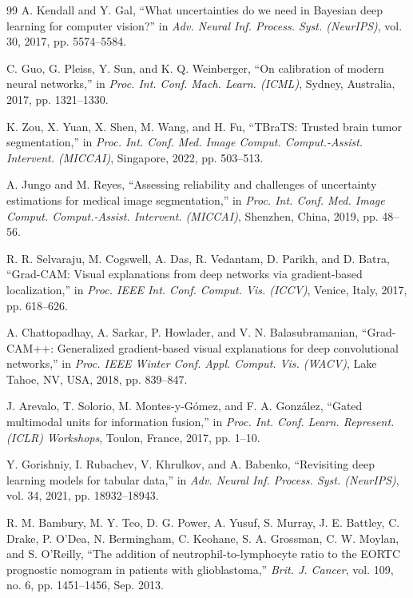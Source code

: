 \documentclass[journal,onecolumn,10pt]{IEEEtran}
\begin{document}
\begin{thebibliography}{99}
A. Kendall and Y. Gal, ``What uncertainties do we need in Bayesian deep learning for computer vision?'' in \textit{Adv. Neural Inf. Process. Syst. (NeurIPS)}, vol. 30, 2017, pp. 5574--5584.

C. Guo, G. Pleiss, Y. Sun, and K. Q. Weinberger, ``On calibration of modern neural networks,'' in \textit{Proc. Int. Conf. Mach. Learn. (ICML)}, Sydney, Australia, 2017, pp. 1321--1330.

K. Zou, X. Yuan, X. Shen, M. Wang, and H. Fu, ``TBraTS: Trusted brain tumor segmentation,'' in \textit{Proc. Int. Conf. Med. Image Comput. Comput.-Assist. Intervent. (MICCAI)}, Singapore, 2022, pp. 503--513.

A. Jungo and M. Reyes, ``Assessing reliability and challenges of uncertainty estimations for medical image segmentation,'' in \textit{Proc. Int. Conf. Med. Image Comput. Comput.-Assist. Intervent. (MICCAI)}, Shenzhen, China, 2019, pp. 48--56.

R. R. Selvaraju, M. Cogswell, A. Das, R. Vedantam, D. Parikh, and D. Batra, ``Grad-CAM: Visual explanations from deep networks via gradient-based localization,'' in \textit{Proc. IEEE Int. Conf. Comput. Vis. (ICCV)}, Venice, Italy, 2017, pp. 618--626.

A. Chattopadhay, A. Sarkar, P. Howlader, and V. N. Balasubramanian, ``Grad-CAM++: Generalized gradient-based visual explanations for deep convolutional networks,'' in \textit{Proc. IEEE Winter Conf. Appl. Comput. Vis. (WACV)}, Lake Tahoe, NV, USA, 2018, pp. 839--847.

J. Arevalo, T. Solorio, M. Montes-y-G\'{o}mez, and F. A. Gonz\'{a}lez, ``Gated multimodal units for information fusion,'' in \textit{Proc. Int. Conf. Learn. Represent. (ICLR) Workshops}, Toulon, France, 2017, pp. 1--10.

Y. Gorishniy, I. Rubachev, V. Khrulkov, and A. Babenko, ``Revisiting deep learning models for tabular data,'' in \textit{Adv. Neural Inf. Process. Syst. (NeurIPS)}, vol. 34, 2021, pp. 18932--18943.

R. M. Bambury, M. Y. Teo, D. G. Power, A. Yusuf, S. Murray, J. E. Battley, C. Drake, P. O'Dea, N. Bermingham, C. Keohane, S. A. Grossman, C. W. Moylan, and S. O'Reilly, ``The addition of neutrophil-to-lymphocyte ratio to the EORTC prognostic nomogram in patients with glioblastoma,'' \textit{Brit. J. Cancer}, vol. 109, no. 6, pp. 1451--1456, Sep. 2013.


\end{thebibliography}
\end{document}
